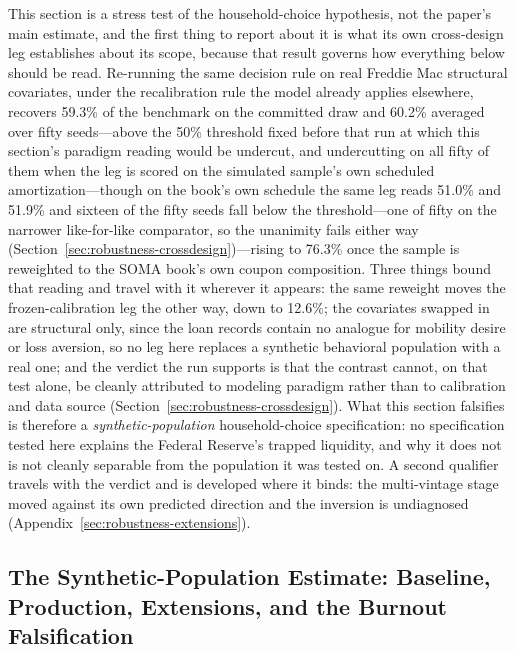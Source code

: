 \documentclass[12pt]{article}
\begin{document}
This section is a stress test of the household-choice hypothesis, not the paper's main estimate, and the first thing to report about it is what its own cross-design leg establishes about its scope, because that result governs how everything below should be read. Re-running the same decision rule on real Freddie Mac structural covariates, under the recalibration rule the model already applies elsewhere, recovers 59.3\% of the benchmark on the committed draw and 60.2\% averaged over fifty seeds---above the 50\% threshold fixed before that run at which this section's paradigm reading would be undercut, and undercutting on all fifty of them when the leg is scored on the simulated sample's own scheduled amortization---though on the book's own schedule the same leg reads 51.0\% and 51.9\% and sixteen of the fifty seeds fall below the threshold---one of fifty on the narrower like-for-like comparator, so the unanimity fails either way (Section~\ref{sec:robustness-crossdesign})---rising to 76.3\% once the sample is reweighted to the SOMA book's own coupon composition. Three things bound that reading and travel with it wherever it appears: the same reweight moves the frozen-calibration leg the other way, down to 12.6\%; the covariates swapped in are structural only, since the loan records contain no analogue for mobility desire or loss aversion, so no leg here replaces a synthetic behavioral population with a real one; and the verdict the run supports is that the contrast cannot, on that test alone, be cleanly attributed to modeling paradigm rather than to calibration and data source (Section~\ref{sec:robustness-crossdesign}). What this section falsifies is therefore a \emph{synthetic-population} household-choice specification: no specification tested here explains the Federal Reserve's trapped liquidity, and why it does not is not cleanly separable from the population it was tested on. A second qualifier travels with the verdict and is developed where it binds: the multi-vintage stage moved against its own predicted direction and the inversion is undiagnosed (Appendix~\ref{sec:robustness-extensions}).

\subsection{The Synthetic-Population Estimate: Baseline, Production, Extensions, and the Burnout Falsification}\label{sec:abm-results}
\end{document}

